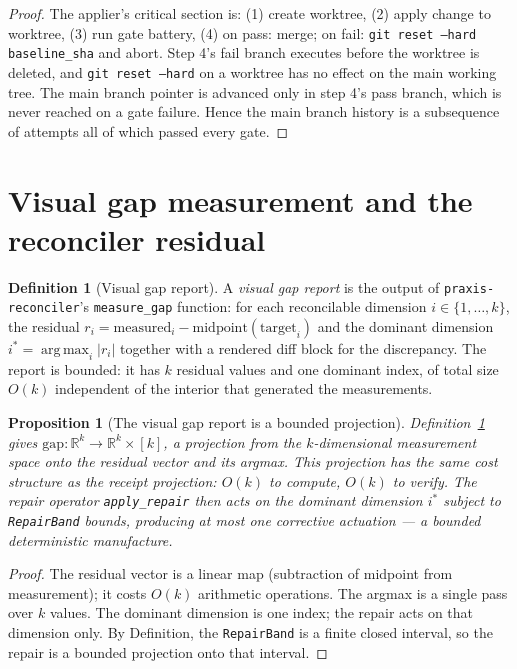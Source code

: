 \documentclass[11pt,oneside]{book}
\theoremstyle{definition}
\newtheorem{definition}{Definition}[chapter]
\theoremstyle{plain}
\newtheorem{proposition}[theorem]{Proposition}
\theoremstyle{remark}
\DeclareMathOperator*{\argmax}{arg\,max}
\newcommand{\code}[1]{\texttt{#1}}
\begin{document}
\begin{proof}
The applier's critical section is: (1) create worktree, (2) apply change to worktree, (3) run gate battery, (4) on pass: merge; on fail: \code{git reset --hard baseline\_sha} and abort. %
Step 4's fail branch executes before the worktree is deleted, and \code{git reset --hard} on a worktree has no effect on the main working tree. %
The main branch pointer is advanced only in step 4's pass branch, which is never reached on a gate failure. %
Hence the main branch history is a subsequence of attempts all of which passed every gate. %
\end{proof}

\section{Visual gap measurement and the reconciler residual}

\begin{definition}[Visual gap report]\label{def:vizgap}
A \emph{visual gap report} is the output of \code{praxis-reconciler}'s \code{measure\_gap} function: for each reconcilable dimension $i\in\{1,\dots,k\}$, the residual $r_i = \mathrm{measured}_i - \mathrm{midpoint}(\mathrm{target}_i)$ and the dominant dimension $i^*=\argmax_i|r_i|$ together with a rendered diff block for the discrepancy. %
The report is bounded: it has $k$ residual values and one dominant index, of total size $O(k)$ independent of the interior that generated the measurements. %
\end{definition}

\begin{proposition}[The visual gap report is a bounded projection]\label{prop:vizgap}
Definition~\ref{def:vizgap} gives $\mathrm{gap}:\mathbb{R}^k\to\mathbb{R}^k\times[k]$, a projection from the $k$-dimensional measurement space onto the residual vector and its argmax. %
This projection has the same cost structure as the receipt projection: $O(k)$ to compute, $O(k)$ to verify. %
The repair operator \code{apply\_repair} then acts on the dominant dimension $i^*$ subject to \code{RepairBand} bounds, producing at most one corrective actuation --- a bounded deterministic manufacture. %
\end{proposition}

\begin{proof}
The residual vector is a linear map (subtraction of midpoint from measurement); it costs $O(k)$ arithmetic operations. %
The argmax is a single pass over $k$ values. %
The dominant dimension is one index; the repair acts on that dimension only. %
By Definition, the \code{RepairBand} is a finite closed interval, so the repair is a bounded projection onto that interval. %
\end{proof}
\end{document}
